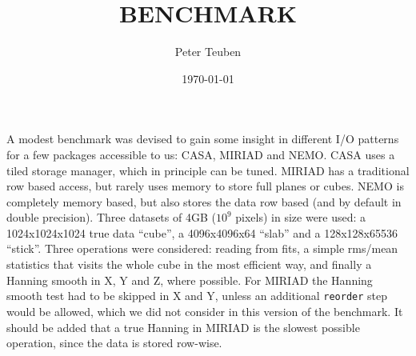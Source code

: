 \documentclass{article}
\title{BENCHMARK}
\author{Peter Teuben}
\date{\today}
\begin{document}
\maketitle


A modest benchmark was devised to gain some insight in different
I/O patterns for a few packages accessible to us: CASA,
MIRIAD and NEMO. CASA uses a tiled storage manager, which in principle
can be tuned. MIRIAD has a traditional row based access, but rarely
uses memory to store full planes or cubes. NEMO is completely
memory based, but also stores the data row based (and by default
in double precision).
Three datasets of 4GB ($10^9$ pixels) in size were used:
a 1024x1024x1024 true data ``cube'',
a 4096x4096x64 ``slab'' and a 128x128x65536 ``stick''.
Three operations were considered:  reading from fits,
a simple rms/mean statistics that visits the whole cube in the
most efficient way, and finally
a Hanning smooth in X, Y and Z, where possible.  For MIRIAD
the Hanning smooth test had to be skipped in X and Y, unless
an additional {\tt reorder} step would be allowed, which we did
not consider in this version of the benchmark.
It should be added that a true Hanning in MIRIAD
is the slowest possible operation, since the data is stored
row-wise.
\end{document}
